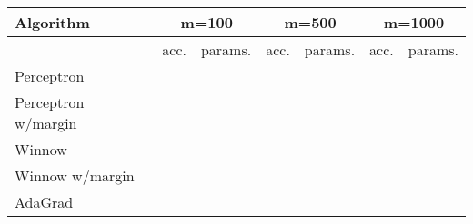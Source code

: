 \begin{center}
  \begin{tabular}{|l|l|l|l|l|l|l|}
\hline
 Algorithm      &  \multicolumn{2}{c|}{m=100} & \multicolumn{2}{c|}{m=500} & \multicolumn{2}{c|}{m=1000}\\\hline\hline
 & acc. & params. & acc. & params. & acc. & params.\\\hline
 Perceptron     & & & & & &\\\hline
 Perceptron w/margin & & & & & &\\\hline
 Winnow              & & & & & &\\\hline
 Winnow w/margin     & & & & & &\\\hline
 AdaGrad & & & & & &\\\hline
\end{tabular}
\end{center}


